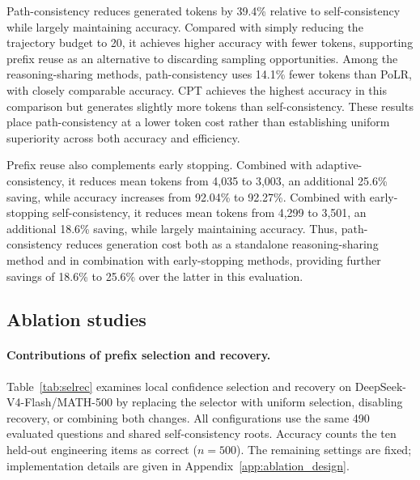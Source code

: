 Path-consistency reduces generated tokens by 39.4\% relative to self-consistency while largely maintaining accuracy. Compared with simply reducing the trajectory budget to 20, it achieves higher accuracy with fewer tokens, supporting prefix reuse as an alternative to discarding sampling opportunities. Among the reasoning-sharing methods, path-consistency uses 14.1\% fewer tokens than PoLR, with closely comparable accuracy. CPT achieves the highest accuracy in this comparison but generates slightly more tokens than self-consistency. These results place path-consistency at a lower token cost rather than establishing uniform superiority across both accuracy and efficiency.

Prefix reuse also complements early stopping. Combined with adaptive-consistency, it reduces mean tokens from 4,035 to 3,003, an additional 25.6\% saving, while accuracy increases from 92.04\% to 92.27\%. Combined with early-stopping self-consistency, it reduces mean tokens from 4,299 to 3,501, an additional 18.6\% saving, while largely maintaining accuracy. Thus, path-consistency reduces generation cost both as a standalone reasoning-sharing method and in combination with early-stopping methods, providing further savings of 18.6\% to 25.6\% over the latter in this evaluation.

\subsection{Ablation studies}
\label{sec:ablations}
\paragraph{Contributions of prefix selection and recovery.}
Table~\ref{tab:selrec} examines local confidence selection and recovery on DeepSeek-V4-Flash/MATH-500 by replacing the selector with uniform selection, disabling recovery, or combining both changes. All configurations use the same 490 evaluated questions and shared self-consistency roots. Accuracy counts the ten held-out engineering items as correct ($n=500$). The remaining settings are fixed; implementation details are given in Appendix~\ref{app:ablation_design}.

